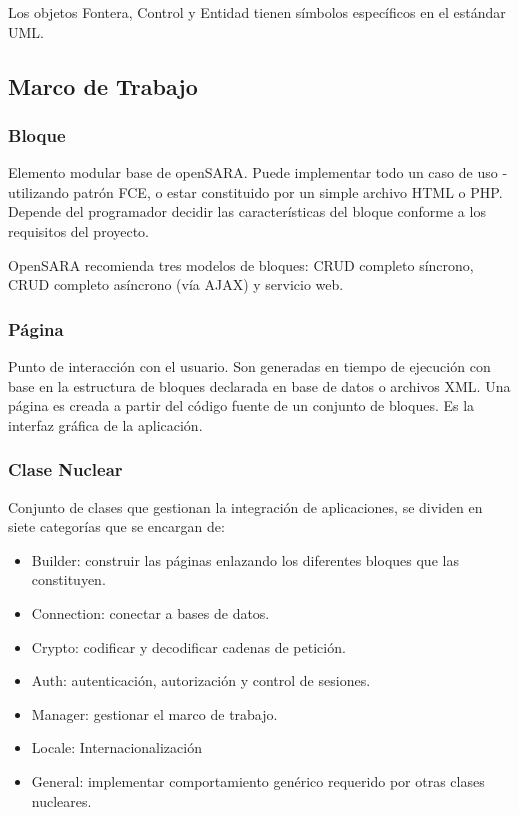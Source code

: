 Los objetos Fontera, Control y Entidad tienen símbolos específicos en el estándar UML.

\subsection{Marco de Trabajo}

\subsubsection{Bloque}
Elemento modular base de openSARA. Puede implementar todo un caso de uso - utilizando patrón FCE, o estar constituido por un simple archivo HTML o PHP. Depende del programador decidir las características del bloque conforme a los requisitos del proyecto. 

OpenSARA recomienda tres modelos de bloques: CRUD completo síncrono, CRUD completo asíncrono (vía AJAX) y servicio web.

\subsubsection{Página}
Punto de interacción con el usuario. Son generadas en tiempo de ejecución con base en la estructura de bloques declarada en base de datos o archivos XML. Una página es creada a partir del código fuente de un conjunto de bloques. Es la interfaz gráfica de la aplicación.

\subsubsection{Clase Nuclear}
Conjunto de clases que gestionan la integración de aplicaciones, se dividen en siete categorías que se encargan de:

\begin{itemize}
 \item Builder: construir las páginas enlazando los diferentes bloques que las constituyen.
 \item Connection: conectar a bases de datos.
 \item Crypto: codificar y decodificar cadenas de petición.
 \item Auth: autenticación, autorización y control de sesiones.
 \item Manager: gestionar el marco de trabajo.
 \item Locale: Internacionalización
 \item General: implementar comportamiento genérico requerido por otras clases nucleares.
\end{itemize}

